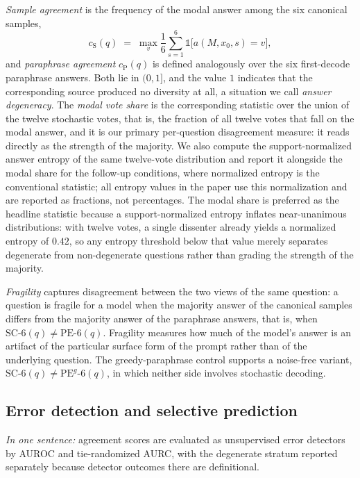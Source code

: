 \emph{Sample agreement} is the frequency of the modal answer among the six canonical samples,
\begin{equation}
c_{\mathrm{S}}(q) \;=\; \max_{v} \frac{1}{6} \sum_{s=1}^{6} \mathbb{1}\bigl[ a(M, x_0, s) = v \bigr],
\end{equation}
and \emph{paraphrase agreement} $c_{\mathrm{P}}(q)$ is defined analogously over the six first-decode paraphrase answers. Both lie in $(0, 1]$, and the value $1$ indicates that the corresponding source produced no diversity at all, a situation we call \emph{answer degeneracy}. The \emph{modal vote share} is the corresponding statistic over the union of the twelve stochastic votes, that is, the fraction of all twelve votes that fall on the modal answer, and it is our primary per-question disagreement measure: it reads directly as the strength of the majority. We also compute the support-normalized answer entropy of the same twelve-vote distribution and report it alongside the modal share for the follow-up conditions, where normalized entropy is the conventional statistic; all entropy values in the paper use this normalization and are reported as fractions, not percentages. The modal share is preferred as the headline statistic because a support-normalized entropy inflates near-unanimous distributions: with twelve votes, a single dissenter already yields a normalized entropy of $0.42$, so any entropy threshold below that value merely separates degenerate from non-degenerate questions rather than grading the strength of the majority.

\emph{Fragility} captures disagreement between the two views of the same question: a question is fragile for a model when the majority answer of the canonical samples differs from the majority answer of the paraphrase answers, that is, when $\mathrm{SC}\text{-}6(q) \ne \mathrm{PE}\text{-}6(q)$. Fragility measures how much of the model's answer is an artifact of the particular surface form of the prompt rather than of the underlying question. The greedy-paraphrase control supports a noise-free variant, $\mathrm{SC}\text{-}6(q) \ne \mathrm{PE}^{g}\text{-}6(q)$, in which neither side involves stochastic decoding.

\subsection{Error detection and selective prediction}

\emph{In one sentence:} agreement scores are evaluated as unsupervised error detectors by AUROC and tie-randomized AURC, with the degenerate stratum reported separately because detector outcomes there are definitional.

